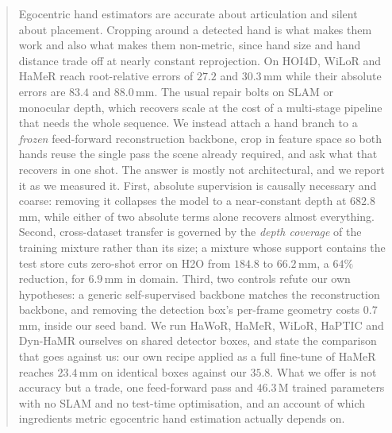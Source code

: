 \begin{abstract}
Egocentric hand estimators are accurate about articulation and silent about placement. Cropping
around a detected hand is what makes them work and also what makes them non-metric, since hand size
and hand distance trade off at nearly constant reprojection. On HOI4D, WiLoR and HaMeR reach
root-relative errors of $27.2$ and $30.3$\,mm while their absolute errors are $83.4$ and $88.0$\,mm.
The usual repair bolts on SLAM or monocular depth, which recovers scale at the cost of a multi-stage
pipeline that needs the whole sequence. We instead attach a hand branch to a \emph{frozen}
feed-forward reconstruction backbone, crop in feature space so both hands reuse the single pass the
scene already required, and ask what that recovers in one shot. The answer is mostly not
architectural, and we report it as we measured it. First, absolute supervision is causally necessary
and coarse: removing it collapses the model to a near-constant depth at $682.8$\,mm, while either of
two absolute terms alone recovers almost everything. Second, cross-dataset transfer is governed by
the \emph{depth coverage} of the training mixture rather than its size; a mixture whose support
contains the test store cuts zero-shot error on H2O from $184.8$ to $\mathbf{66.2}$\,mm, a $64\%$
reduction, for $6.9$\,mm in domain. Third, two controls refute our own hypotheses: a generic
self-supervised backbone matches the reconstruction backbone, and removing the detection box's
per-frame geometry costs $0.7$\,mm, inside our seed band. We run HaWoR, HaMeR, WiLoR, HaPTIC and
Dyn-HaMR ourselves on shared detector boxes, and state the comparison that goes against us: our own
recipe applied as a full fine-tune of HaMeR reaches $23.4$\,mm on identical boxes against our
$35.8$. What we offer is not accuracy but a trade, one feed-forward pass and $46.3$\,M trained
parameters with no SLAM and no test-time optimisation, and an account of which ingredients metric
egocentric hand estimation actually depends on.
\end{abstract}
